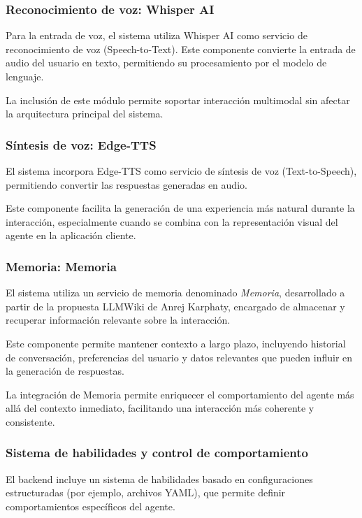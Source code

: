 \documentclass[12pt]{article}
\begin{document}
\subsubsection{Reconocimiento de voz: Whisper AI}

Para la entrada de voz, el sistema utiliza Whisper AI como servicio de reconocimiento de voz (Speech-to-Text). Este componente convierte la entrada de audio del usuario en texto, permitiendo su procesamiento por el modelo de lenguaje.

La inclusión de este módulo permite soportar interacción multimodal sin afectar la arquitectura principal del sistema.

\subsubsection{Síntesis de voz: Edge-TTS}

El sistema incorpora Edge-TTS como servicio de síntesis de voz (Text-to-Speech), permitiendo convertir las respuestas generadas en audio.

Este componente facilita la generación de una experiencia más natural durante la interacción, especialmente cuando se combina con la representación visual del agente en la aplicación cliente.

\subsubsection{Memoria: Memoria}

El sistema utiliza un servicio de memoria denominado \textit{Memoria}, desarrollado a partir de la propuesta LLMWiki de Anrej Karphaty, encargado de almacenar y recuperar información relevante sobre la interacción.

Este componente permite mantener contexto a largo plazo, incluyendo historial de conversación, preferencias del usuario y datos relevantes que pueden influir en la generación de respuestas.

La integración de Memoria permite enriquecer el comportamiento del agente más allá del contexto inmediato, facilitando una interacción más coherente y consistente.

\subsubsection{Sistema de habilidades y control de comportamiento}

El backend incluye un sistema de habilidades basado en configuraciones estructuradas (por ejemplo, archivos YAML), que permite definir comportamientos específicos del agente.
\end{document}
